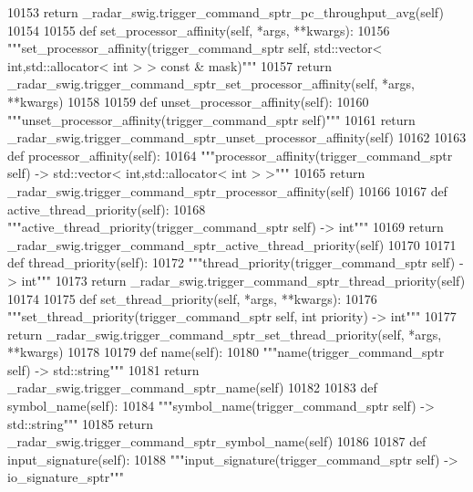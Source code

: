 \begin{DoxyCode}
{{{{{{{{{{{{{{{{{{{{{{{{{{{{{{{{10153         \textcolor{keywordflow}{return} \_radar\_swig.trigger\_command\_sptr\_pc\_throughput\_avg(self)
10154 
10155     \textcolor{keyword}{def }set_processor_affinity(self, *args, **kwargs):
10156         \textcolor{stringliteral}{"""set\_processor\_affinity(trigger\_command\_sptr self, std::vector< int,std::allocator< int > > const
       & mask)"""}
10157         \textcolor{keywordflow}{return} \_radar\_swig.trigger\_command\_sptr\_set\_processor\_affinity(self, *args, **kwargs)
10158 
10159     \textcolor{keyword}{def }unset_processor_affinity(self):
10160         \textcolor{stringliteral}{"""unset\_processor\_affinity(trigger\_command\_sptr self)"""}
10161         \textcolor{keywordflow}{return} \_radar\_swig.trigger\_command\_sptr\_unset\_processor\_affinity(self)
10162 
10163     \textcolor{keyword}{def }processor_affinity(self):
10164         \textcolor{stringliteral}{"""processor\_affinity(trigger\_command\_sptr self) -> std::vector< int,std::allocator< int > >"""}
10165         \textcolor{keywordflow}{return} \_radar\_swig.trigger\_command\_sptr\_processor\_affinity(self)
10166 
10167     \textcolor{keyword}{def }active_thread_priority(self):
10168         \textcolor{stringliteral}{"""active\_thread\_priority(trigger\_command\_sptr self) -> int"""}
10169         \textcolor{keywordflow}{return} \_radar\_swig.trigger\_command\_sptr\_active\_thread\_priority(self)
10170 
10171     \textcolor{keyword}{def }thread_priority(self):
10172         \textcolor{stringliteral}{"""thread\_priority(trigger\_command\_sptr self) -> int"""}
10173         \textcolor{keywordflow}{return} \_radar\_swig.trigger\_command\_sptr\_thread\_priority(self)
10174 
10175     \textcolor{keyword}{def }set_thread_priority(self, *args, **kwargs):
10176         \textcolor{stringliteral}{"""set\_thread\_priority(trigger\_command\_sptr self, int priority) -> int"""}
10177         \textcolor{keywordflow}{return} \_radar\_swig.trigger\_command\_sptr\_set\_thread\_priority(self, *args, **kwargs)
10178 
10179     \textcolor{keyword}{def }name(self):
10180         \textcolor{stringliteral}{"""name(trigger\_command\_sptr self) -> std::string"""}
10181         \textcolor{keywordflow}{return} \_radar\_swig.trigger\_command\_sptr\_name(self)
10182 
10183     \textcolor{keyword}{def }symbol_name(self):
10184         \textcolor{stringliteral}{"""symbol\_name(trigger\_command\_sptr self) -> std::string"""}
10185         \textcolor{keywordflow}{return} \_radar\_swig.trigger\_command\_sptr\_symbol\_name(self)
10186 
10187     \textcolor{keyword}{def }input_signature(self):
10188         \textcolor{stringliteral}{"""input\_signature(trigger\_command\_sptr self) -> io\_signature\_sptr"""}
}}}}}}}}}}}}}}}}}}}}}}}}}}}}}}}}
\end{DoxyCode}
